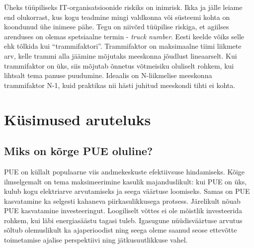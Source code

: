 Üheks tüüpiliseks IT-organisatsioonide riskiks on inimrisk. Ikka ja jälle leiame end olukorrast, kus kogu teadmine mingi valdkonna või süsteemi kohta on koondunud ühe inimese pähe. Tegu on niivõrd tüüpilise riskiga, et agiilses arenduses on olemas spetsiaalne termin - \emph{truck number}\cite{coplien2004organizational}. Eesti keelde võiks selle ehk tõlkida kui \enquote{trammifaktori}. Trammifaktor on maksimaalne tiimi liikmete arv, kelle trammi alla jäämine mõjutaks meeskonna jõudlust lineaarselt. Kui trammifaktor on üks, siis mõjutab õnnetus võtmeisiku oluliselt rohkem, kui lihtsalt tema panuse puudumine. Ideaalis on N-liikmelise meeskonna trammifaktor N-1, kuid praktikas nii hästi juhitud meeskondi tihti ei kohta. 

\section{Küsimused aruteluks}
\subsection{Miks on kõrge PUE oluline?}
PUE on küllalt populaarne viis andmekeskuste efektiivsuse hindamiseks. Kõige ilmselgemalt on tema maksimeerimine kasulik majanduslikult: kui PUE on üks, kulub kogu elektriarve arvutamiseks ja seega väärtuse loomiseks. Samas on PUE kasvatamine ka selgesti kahaneva piirkasulikkusega protsess. Järelikult nõuab PUE kasvatamine investeeringut. Loogiliselt võttes ei ole mõistlik investeerida rohkem, kui läbi energiasäästu tagasi tuleb. Igasugune nüüdisväärtuse arvutus sõltub olemuslikult ka ajaperioodist ning seega oleme saanud seose ettevõtte toimetamise ajalise perspektiivi ning jätkusuutlikkuse vahel. 

